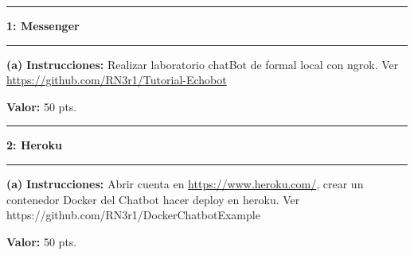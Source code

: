 \documentclass[11pt]{article}
\newcommand\question[2]{\vspace{.25in}\hrule\textbf{#1: #2}\vspace{.5em}\hrule\vspace{.10in}}
\renewcommand\part[1]{\vspace{.10in}\textbf{(#1)}}
\newcommand\algorithm{\vspace{.10in}\textbf{Instrucciones: }}
\newcommand\correctness{\vspace{.10in}\textbf{Valor: }}
\begin{document}
\raggedright

\newcommand\NAME{Adolfo Centeno}  
\newcommand\ADSOFTID{adsoft}     
\newcommand\HWNUM{3}              

\question{1}{Messenger} 

\part{a} \algorithm  Realizar laboratorio chatBot de formal local con ngrok. Ver \url{https://github.com/RN3r1/Tutorial-Echobot}

\correctness 50 pts.

\question{2}{Heroku}
\part{a} \algorithm Abrir cuenta en \url{https://www.heroku.com/}, crear un contenedor Docker del Chatbot hacer deploy en heroku. Ver {https://github.com/RN3r1/DockerChatbotExample} 

\correctness 50 pts.
\end{document}
